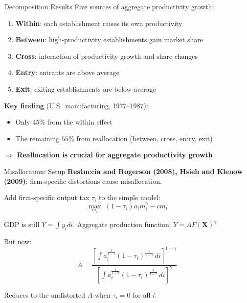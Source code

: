 \documentclass[blue]{beamer}
\begin{document}
\begin{frame}{Decomposition Results}
	Five sources of aggregate productivity growth:
	\begin{enumerate}
		\item \textbf{Within}: each establishment raises its own productivity
		\item \textbf{Between}: high-productivity establishments gain market share
		\item \textbf{Cross}: interaction of productivity growth and share changes
		\item \textbf{Entry}: entrants are above average
		\item \textbf{Exit}: exiting establishments are below average
	\end{enumerate}
	
	\bigskip
	\textbf{Key finding} (U.S.\ manufacturing, 1977--1987):
	\begin{itemize}
		\item Only ${45\%}$ from the within effect
		\item The remaining ${55\%}$ from reallocation (between, cross, entry, exit)
	\end{itemize}
	
	$\Rightarrow$ \textbf{Reallocation is crucial for aggregate productivity growth}
\end{frame}
\begin{frame}{Misallocation: Setup}
	\textbf{Restuccia and Rogerson (2008), Hsieh and Klenow (2009)}: firm-specific distortions cause misallocation.
	
	\bigskip
	Add firm-specific output tax $\tau_i$ to the simple model:
	\[
	\max_{m_i} \; (1-\tau_i) a_i m_i^\gamma - c m_i
	\]
	
	\medskip
	GDP is still $Y = \int y_i  di$. Aggregate production function: $Y = A F(\mathbf{X})^\gamma$
	
	\medskip
	But now:
	\[
	A = \frac{\left[ \int a_i^{\frac{1}{1-\gamma}} (1-\tau_i)^{\frac{\gamma}{1-\gamma}} \, di \right]^{1-\gamma}}{\left[ \int a_i^{\frac{1}{1-\gamma}} (1-\tau_i)^{\frac{1}{1-\gamma}} \, di \right]^{\gamma}}
	\]
	
	Reduces to the undistorted $A$ when $\tau_i = 0$ for all $i$.
\end{frame}
\end{document}
